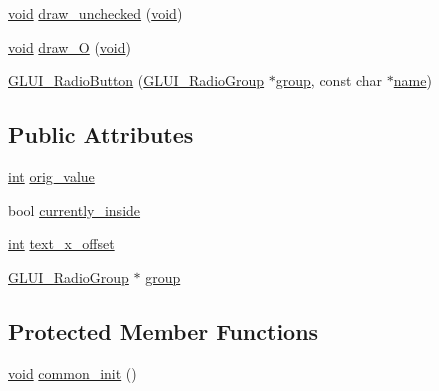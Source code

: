\begin{DoxyCompactItemize}
\item 
\hyperlink{wglext_8h_a9e6b7f1933461ef318bb000d6bd13b83}{void} \hyperlink{class_g_l_u_i___radio_button_af0d77a13832451f0140c41e8bc0769a0}{draw\+\_\+unchecked} (\hyperlink{wglext_8h_a9e6b7f1933461ef318bb000d6bd13b83}{void})
\item 
\hyperlink{wglext_8h_a9e6b7f1933461ef318bb000d6bd13b83}{void} \hyperlink{class_g_l_u_i___radio_button_a1591bf4a0d8b0c1e286365d973693d40}{draw\+\_\+\+O} (\hyperlink{wglext_8h_a9e6b7f1933461ef318bb000d6bd13b83}{void})
\item 
\hyperlink{class_g_l_u_i___radio_button_ab3bda5fa0bd41bc49b064f474513ceaf}{G\+L\+U\+I\+\_\+\+Radio\+Button} (\hyperlink{class_g_l_u_i___radio_group}{G\+L\+U\+I\+\_\+\+Radio\+Group} $\ast$\hyperlink{glext_8h_a69cec9b28d037f2272131b4fcd148620}{group}, const char $\ast$\hyperlink{glext_8h_ad977737dfc9a274a62741b9500c49a32}{name})
\end{DoxyCompactItemize}
\subsection*{Public Attributes}
\begin{DoxyCompactItemize}
\item 
\hyperlink{wglext_8h_a500a82aecba06f4550f6849b8099ca21}{int} \hyperlink{class_g_l_u_i___radio_button_aa874a5e29d93e5e65befd745d0e16454}{orig\+\_\+value}
\item 
bool \hyperlink{class_g_l_u_i___radio_button_ae4bcf4b331712a2dc21f944e00071cf6}{currently\+\_\+inside}
\item 
\hyperlink{wglext_8h_a500a82aecba06f4550f6849b8099ca21}{int} \hyperlink{class_g_l_u_i___radio_button_a857d2387855fca92f0ae322e3f6fc19a}{text\+\_\+x\+\_\+offset}
\item 
\hyperlink{class_g_l_u_i___radio_group}{G\+L\+U\+I\+\_\+\+Radio\+Group} $\ast$ \hyperlink{class_g_l_u_i___radio_button_ab9906e39403d7b15810384a59e99e054}{group}
\end{DoxyCompactItemize}
\subsection*{Protected Member Functions}
\begin{DoxyCompactItemize}
\item 
\hyperlink{wglext_8h_a9e6b7f1933461ef318bb000d6bd13b83}{void} \hyperlink{class_g_l_u_i___radio_button_aba1127e895ee062d421b8e6cd6f4bb48}{common\+\_\+init} ()
\end{DoxyCompactItemize}
